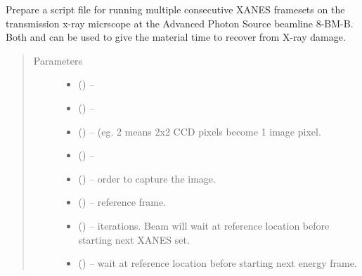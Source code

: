 \documentclass[letterpaper,10pt,english]{sphinxmanual}
\begin{document}

\begin{fulllineitems}
\label{\detokenize{xanespy:xanespy.beamlines.ssrl6_xanes_script}}
Prepare a script file for running multiple consecutive XANES
framesets on the transmission x-ray micrscope at the Advanced
Photon Source beamline 8-BM-B. Both  and
 can be used to give the material time to recover from
X-ray damage.
\begin{quote}\begin{description}
\item[{Parameters}] \leavevmode\begin{itemize}
\item {} 
 (\sphinxstyleliteralemphasis{-}) -- 

\item {} 
 (\sphinxstyleliteralemphasis{-}) -- 

\item {} 
 (\sphinxstyleliteralemphasis{-}) -- (eg. 2 means 2x2 CCD pixels become 1 image pixel.

\item {} 
 (\sphinxstyleliteralemphasis{-}) -- 

\item {} 
 (\sphinxstyleliteralemphasis{-}) -- order to capture the image.

\item {} 
 (\sphinxstyleliteralemphasis{-}) -- reference frame.

\item {} 
 (\sphinxstyleliteralemphasis{-}) -- iterations. Beam will wait at reference location before starting
next XANES set.

\item {} 
 (\sphinxstyleliteralemphasis{-}) -- wait at reference location before starting next energy frame.


\end{itemize}
\end{description}
\end{quote}
\end{fulllineitems}
\end{document}
